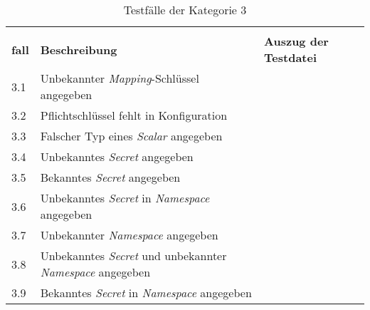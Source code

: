\begin{table}[H]
    \centering
    \begin{tabularx}{\columnwidth}{lXl}
        \toprule
        \begin{tabular}{@{}l@{}}\textbf{Test-} \\ \textbf{fall} \end{tabular} & \textbf{Beschreibung}                                                    & \textbf{Auszug der Testdatei}                            \\
        \midrule
        3.1                                                                   & Unbekannter \textit{Mapping}-Schlüssel angegeben                         &  \\
        \midrule
        3.2                                                                   & Pflichtschlüssel fehlt in Konfiguration                                  &  \\
        \midrule
        3.3                                                                   & Falscher Typ eines \textit{Scalar} angegeben                             &  \\
        \midrule
        3.4                                                                   & Unbekanntes \textit{Secret} angegeben                                    &  \\
        \midrule
        3.5                                                                   & Bekanntes  \textit{Secret} angegeben                                     &  \\
        \midrule
        3.6                                                                   & Unbekanntes \textit{Secret} in \textit{Namespace} angegeben              &  \\
        \midrule
        3.7                                                                   & Unbekannter \textit{Namespace} angegeben                                 &  \\
        \midrule
        3.8                                                                   & Unbekanntes \textit{Secret} und unbekannter \textit{Namespace} angegeben &  \\
        \midrule
        3.9                                                                   & Bekanntes \textit{Secret} in \textit{Namespace} angegeben                &  \\
        \bottomrule
    \end{tabularx}
    \caption{Testfälle der Kategorie 3}
    \label{tbl:evaluation-test-cases-category-3}
\end{table}

